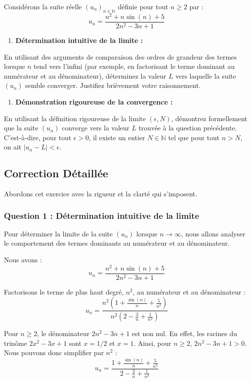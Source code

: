 \documentclass[a4paper,11pt]{report}
\begin{document}
Considérons la suite réelle $(u_n)_{n \in \mathbb{N}}$ définie pour tout $n \ge 2$ par :
$$u_n = \frac{n^2 + n\sin(n) + 5}{2n^2 - 3n + 1}$$
\begin{enumerate}
\item \textbf{Détermination intuitive de la limite :}
\end{enumerate}
    En utilisant des arguments de comparaison des ordres de grandeur des termes lorsque $n$ tend vers l'infini (par exemple, en factorisant le terme dominant au numérateur et au dénominateur), déterminez la valeur $L$ vers laquelle la suite $(u_n)$ semble converger. Justifiez brièvement votre raisonnement.
\begin{enumerate}
\item \textbf{Démonstration rigoureuse de la convergence :}
\end{enumerate}
    En utilisant la définition rigoureuse de la limite $(\epsilon, N)$, démontrez formellement que la suite $(u_n)$ converge vers la valeur $L$ trouvée à la question précédente. C'est-à-dire, pour tout $\epsilon > 0$, il existe un entier $N \in \mathbb{N}$ tel que pour tout $n > N$, on ait $|u_n - L| < \epsilon$.

\subsection*{Correction Détaillée}

Abordons cet exercice avec la rigueur et la clarté qui s'imposent.

\subsubsection*{Question 1 : Détermination intuitive de la limite}

Pour déterminer la limite de la suite $(u_n)$ lorsque $n \to \infty$, nous allons analyser le comportement des termes dominants au numérateur et au dénominateur.

Nous avons :
$$u_n = \frac{n^2 + n\sin(n) + 5}{2n^2 - 3n + 1}$$

Factorisons le terme de plus haut degré, $n^2$, au numérateur et au dénominateur :
$$u_n = \frac{n^2 \left(1 + \frac{\sin(n)}{n} + \frac{5}{n^2}\right)}{n^2 \left(2 - \frac{3}{n} + \frac{1}{n^2}\right)}$$

Pour $n \ge 2$, le dénominateur $2n^2 - 3n + 1$ est non nul. En effet, les racines du trinôme $2x^2 - 3x + 1$ sont $x=1/2$ et $x=1$. Ainsi, pour $n \ge 2$, $2n^2 - 3n + 1 > 0$. Nous pouvons donc simplifier par $n^2$ :
$$u_n = \frac{1 + \frac{\sin(n)}{n} + \frac{5}{n^2}}{2 - \frac{3}{n} + \frac{1}{n^2}}$$
\end{document}

